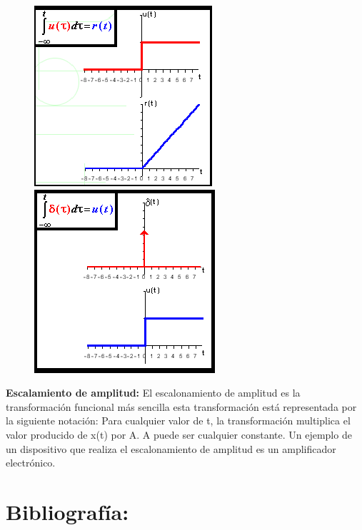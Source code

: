 \documentclass[10pt]{article}
\begin{document}
\begin{figure}[h]
	\includegraphics[scale=0.55]{1}
	\includegraphics[scale=0.55]{2}
	\centering
\end{figure}

\textbf{Escalamiento de amplitud:}
El escalonamiento de amplitud es la transformación funcional más sencilla esta transformación está representada por la siguiente notación: 
Para cualquier valor de t, la transformación multiplica el valor producido de x(t) por A. 
A puede ser cualquier constante.
Un ejemplo de un dispositivo que realiza el escalonamiento de amplitud es un amplificador electrónico.


\section{Bibliografía:}
\end{document}
